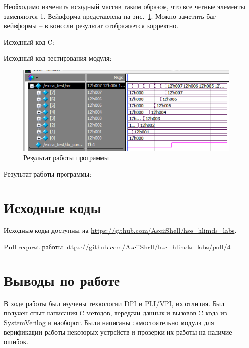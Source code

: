 \documentclass[a4paper,14pt]{article}
\begin{document}
	Необходимо изменить исходный массив таким образом, что все четные элементы заменяются 1.
	Вейвформа представлена на рис.~\ref{fig:04_extra}.
	Можно заметить баг вейвформы -- в консоли результат отображается корректно.
	
	Исходный код C:
	{\small {}}

	Исходный код тестирования модуля:
	{\small {}}
	
	\begin{figure}[H]
		\centering
		\includegraphics[width=\linewidth]{images/04_extra}
		\caption{Результат работы программы}
		\label{fig:04_extra}
	\end{figure}
	
	Результат работы программы:
	{\small {}}
	
	
    \section{Исходные коды}

    Исходные коды доступны на \href{https://github.com/AsciiShell/hse_hlimds_labs}
    {https://github.com/AsciiShell/hse\_hlimds\_labs}.

    Pull request работы \href{https://github.com/AsciiShell/hse_hlimds_labs/pull/4}
    {https://github.com/AsciiShell/hse\_hlimds\_labs/pull/4}.


    \section{Выводы по работе}
    
    В ходе работы был изучены технологии DPI и PLI/VPI, их отличия.
    Был получен опыт написания C методов, передачи данных и вызовов C кода из SystemVerilog и наоборот.
    Были написаны самостоятельно модули для верификации работы некоторых устройств и проверки их работы на наличие ошибок.
\end{document}
